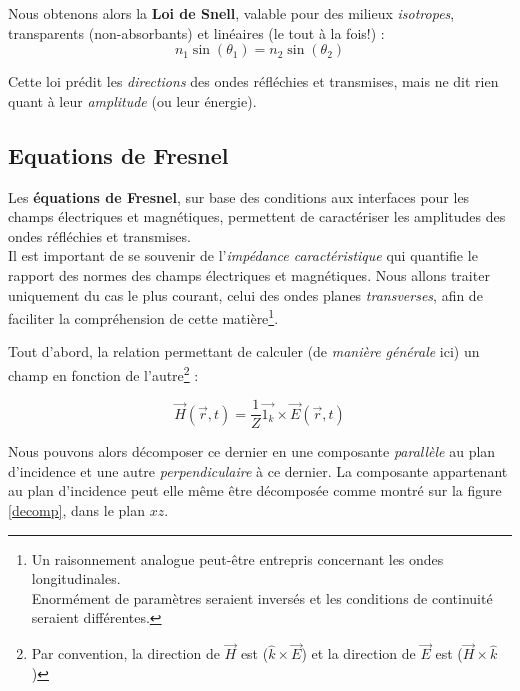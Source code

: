 Nous obtenons alors la \textbf{Loi de Snell}, valable pour des milieux \textit{isotropes}, transparents (non-absorbants) et linéaires (le tout à la fois!) :
\[ n_{1} \sin(\theta_{1}) = n_{2} \sin(\theta_{2})\]

Cette loi prédit les \textit{directions} des ondes réfléchies et transmises, mais ne dit rien quant à leur \textsl{amplitude} (ou leur énergie). 

\subsection{Equations de Fresnel}

Les \textbf{équations de Fresnel}, sur base des conditions aux interfaces pour les champs électriques et magnétiques, permettent de caractériser les amplitudes des ondes réfléchies et transmises. \\ 
Il est important de se souvenir de l'\textit{impédance caractéristique} qui quantifie le rapport des normes des champs électriques et magnétiques. Nous allons traiter uniquement du cas le plus courant, celui des ondes planes \textit{transverses}, afin de faciliter la compréhension de cette matière\footnote{Un raisonnement analogue peut-être entrepris concernant les ondes longitudinales. \\Enormément de paramètres seraient inversés et les conditions de continuité seraient différentes.}.

Tout d'abord, la relation permettant de calculer (de \textit{manière générale} ici) un champ en fonction de l'autre\footnote{Par convention, la direction de $\vec{H}$ est ($\hat{k} \times \vec{E}$) et la direction de $\vec{E}$ est 
($ \vec{H} \times \hat{k}$) } : 

\[\vec{H}(\vec{r},t) = \frac{1}{Z}\vec{1_k} \times \vec{E}(\vec{r},t) \]%

Nous pouvons alors décomposer ce dernier en une composante \textit{parallèle} au plan d'incidence et une autre \textit{perpendiculaire} à ce dernier. La composante appartenant au plan d'incidence peut elle même être décomposée comme montré sur la figure \ref{decomp}, dans le plan $xz$.

